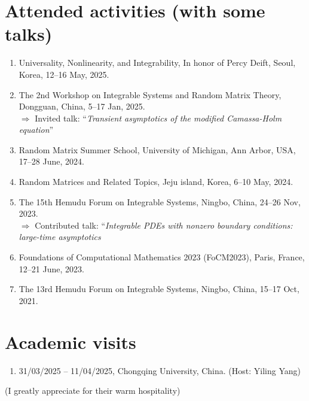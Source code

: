 \documentclass[margin]{res}
\begin{document}
\begin{resume}
\section{Attended activities (with some talks)}
\begin{enumerate}[--]
\item Universality, Nonlinearity, and Integrability, In honor of Percy Deift, Seoul, Korea, 12--16 May, 2025.
\item The 2nd Workshop on Integrable Systems and Random Matrix Theory, Dongguan, China, 5--17 Jan, 2025. \\ $\Rightarrow$ Invited talk: ``{\sl Transient asymptotics of the modified Camassa-Holm equation}''
\item Random Matrix Summer School, University of Michigan, Ann Arbor, USA, 17--28 June, 2024.
\item Random Matrices and Related Topics, Jeju island, Korea, 6--10 May, 2024.
\item The 15th Hemudu Forum on Integrable Systems, Ningbo, China, 24--26 Nov, 2023. \\  $\Rightarrow$ Contributed talk: ``{\sl Integrable PDEs with nonzero boundary conditions: large-time asymptotics}
\item Foundations of Computational Mathematics 2023 (FoCM2023), Paris, France, 12--21 June, 2023.
\item The 13rd Hemudu Forum on Integrable Systems, Ningbo, China, 15--17 Oct, 2021.
\end{enumerate}


\section{Academic visits}
\begin{enumerate}[--]
\item 31/03/2025 -- 11/04/2025, Chongqing University, China. (Host: Yiling Yang)
\end{enumerate}
(I greatly appreciate for their warm hospitality)



\end{resume}
\end{document}
